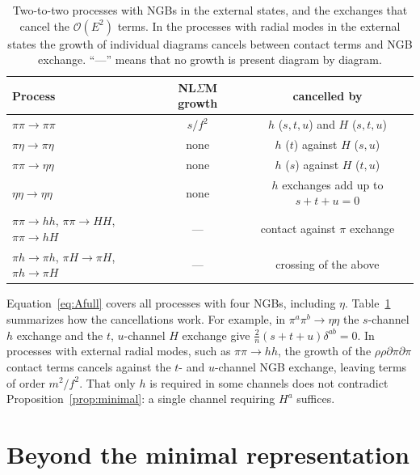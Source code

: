 \documentclass[aps,prd,twocolumn,superscriptaddress,nofootinbib,floatfix]{revtex4-2}
\theoremstyle{remark}
\begin{document}
\begin{table}[t]
\caption{Two-to-two processes with NGBs in the external states, and the exchanges that cancel the $\mathcal{O}(E^2)$ terms. In the processes with radial modes in the external states the growth of individual diagrams cancels between contact terms and NGB exchange. ``---'' means that no growth is present diagram by diagram.}
\label{tab:processes}
\begin{ruledtabular}
\begin{tabular}{lcc}
Process & NL$\Sigma$M growth & cancelled by \\
\hline
$\pi\pi\to\pi\pi$ & $s/f^2$ & $h$ ($s,t,u$) and $H$ ($s,t,u$) \\
$\pi\eta\to\pi\eta$ & none & $h$ ($t$) against $H$ ($s,u$) \\
$\pi\pi\to\eta\eta$ & none & $h$ ($s$) against $H$ ($t,u$) \\
$\eta\eta\to\eta\eta$ & none & $h$ exchanges add up to $s+t+u=0$ \\
$\pi\pi\to hh$, $\pi\pi\to HH$, $\pi\pi\to hH$ & --- & contact against $\pi$ exchange \\
$\pi h\to\pi h$, $\pi H\to\pi H$, $\pi h\to\pi H$ & --- & crossing of the above
\end{tabular}
\end{ruledtabular}
\end{table}

Equation~\eqref{eq:Afull} covers all processes with four NGBs, including $\eta$. Table~\ref{tab:processes} summarizes how the cancellations work. For example, in $\pi^a\pi^b\to\eta\eta$ the $s$-channel $h$ exchange and the $t$, $u$-channel $H$ exchange give $\frac2n(s+t+u)\delta^{ab}=0$. In processes with external radial modes, such as $\pi\pi\to hh$, the growth of the $\rho\rho\partial\pi\partial\pi$ contact terms cancels against the $t$- and $u$-channel NGB exchange, leaving terms of order $m^2/f^2$. That only $h$ is required in some channels does not contradict Proposition~\ref{prop:minimal}: a single channel requiring $H^a$ suffices.

\section{Beyond the minimal representation}
\label{sec:beyond}
\end{document}
